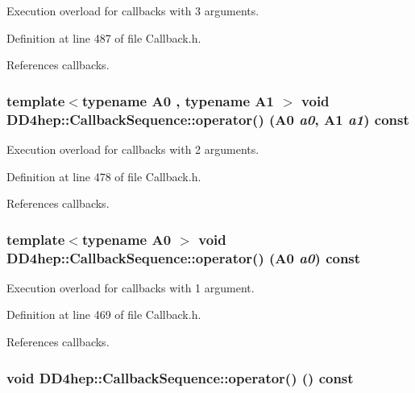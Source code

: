 Execution overload for callbacks with 3 arguments. 

Definition at line 487 of file Callback.h.

References callbacks.\hypertarget{struct_d_d4hep_1_1_callback_sequence_ae44f3102042e74244b739d273b0e7e24}{
\subsubsection[{operator()}]{\setlength{\rightskip}{0pt plus 5cm}template$<$typename A0 , typename A1 $>$ void DD4hep::CallbackSequence::operator() (A0 {\em a0}, \/  A1 {\em a1}) const}}
\label{struct_d_d4hep_1_1_callback_sequence_ae44f3102042e74244b739d273b0e7e24}


Execution overload for callbacks with 2 arguments. 

Definition at line 478 of file Callback.h.

References callbacks.\hypertarget{struct_d_d4hep_1_1_callback_sequence_a020fb8efdc61f29ac5d8740d96912af3}{
\subsubsection[{operator()}]{\setlength{\rightskip}{0pt plus 5cm}template$<$typename A0 $>$ void DD4hep::CallbackSequence::operator() (A0 {\em a0}) const}}
\label{struct_d_d4hep_1_1_callback_sequence_a020fb8efdc61f29ac5d8740d96912af3}


Execution overload for callbacks with 1 argument. 

Definition at line 469 of file Callback.h.

References callbacks.\hypertarget{struct_d_d4hep_1_1_callback_sequence_ae4fc09e6d68a198eba141cffc1875479}{
\subsubsection[{operator()}]{\setlength{\rightskip}{0pt plus 5cm}void DD4hep::CallbackSequence::operator() () const}}
\label{struct_d_d4hep_1_1_callback_sequence_ae4fc09e6d68a198eba141cffc1875479}



